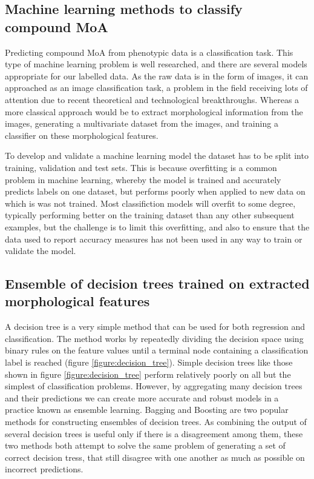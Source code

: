 \documentclass[a4paper,11pt,twoside,openright]{scrbook}
\begin{document}
\subsection{Machine learning methods to classify compound MoA}
Predicting compound MoA from phenotypic data is a classification task.
This type of machine learning problem is well researched, and there are several models appropriate for our labelled data.
As the raw data is in the form of images, it can approached as an image classification task, a problem in the field receiving lots of attention due to recent theoretical and technological breakthroughs. %
Whereas a more classical approach would be to extract morphological information from the images, generating a multivariate dataset from the images, and training a classifier on these morphological features.

To develop and validate a machine learning model the dataset has to be split into training, validation and test sets.
This is because overfitting is a common problem in machine learning, whereby the model is trained and accurately predicts labels on one dataset, but performs poorly when applied to new data on which is was not trained.
Most classifiction models will overfit to some degree, typically performing better on the training dataset than any other subsequent examples, but the challenge is to limit this overfitting, and also to ensure that the data used to report accuracy measures has not been used in any way to train or validate the model.




\subsection{Ensemble of decision trees trained on extracted morphological features}
A decision tree is a very simple method that can be used for both regression and classification.
The method works by repeatedly dividing the decision space using binary rules on the feature values until a terminal node containing a classification label is reached (figure \ref{figure:decision_tree}).
Simple decision trees like those shown in figure \ref{figure:decision_tree} perform relatively poorly on all but the simplest of classification problems.
However, by aggregating many decision trees and their predictions we can create more accurate and robust models in a practice known as ensemble learning. \cite{Opitz1999}
Bagging \cite{Breiman1996} and Boosting \cite{Freund1996} are two popular methods for constructing ensembles of decision trees.
As combining the output of several decision trees is useful only if there is a disagreement among them, these two methods both attempt to solve the same problem of generating a set of correct decision tress, that still disagree with one another as much as possible on incorrect predictions.
\end{document}
